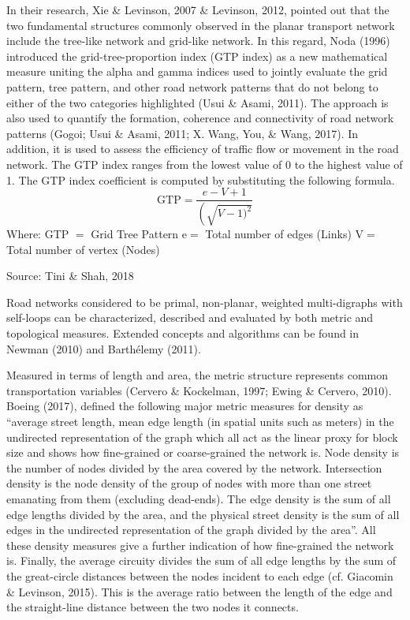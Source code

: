 In their research, Xie \& Levinson, 2007 \& Levinson, 2012, pointed out that the two fundamental structures commonly observed in the planar transport network include the tree-like network and grid-like network. In this regard, Noda (1996) introduced the grid-tree-proportion index (GTP index) as a new mathematical measure uniting the alpha and gamma indices used to jointly evaluate the grid pattern, tree pattern, and other road network patterns that do not belong to either of the two categories  highlighted (Usui \& Asami, 2011). The approach is also used to quantify the formation, coherence and connectivity of road network patterns (Gogoi; Usui \& Asami, 2011; X. Wang, You, & Wang, 2017). In addition, it is used to assess the efficiency of traffic flow or movement in the road network. The GTP index ranges from the lowest value of 0 to the highest value of 1. The GTP index coefficient is computed by substituting the following formula.
$$
\mathrm{GTP}=\frac{e-V+1}{\left(\sqrt{V-1)^{2}}\right.}
$$
Where:
GTP $=$ Grid Tree Pattern
$\mathrm{e}=$ Total number of edges (Links)
$\mathrm{V}=$ Total number of vertex (Nodes)
\caption{Source: Tini \& Shah, 2018}

Road networks considered to be primal, non-planar, weighted multi-digraphs with self-loops can be characterized, described and evaluated by both metric and topological measures. Extended concepts and algorithms can be found in Newman (2010) and Barthélemy (2011). 

Measured in terms of length and area, the metric structure represents common transportation variables (Cervero \& Kockelman, 1997; Ewing \& Cervero, 2010). Boeing (2017), defined the following major metric measures for density as “average street length, mean edge length (in spatial units such as meters) in the undirected representation of the graph which all act as the linear proxy for block size and shows how fine-grained or coarse-grained the network is. Node density is the number of nodes divided by the area covered by the network. Intersection density is the node density of the group of nodes with more than one street emanating from them (excluding dead-ends). The edge density is the sum of all edge lengths divided by the area, and the physical street density is the sum of all edges in the undirected representation of the graph divided by the area”. All these density measures give a further indication of how fine-grained the network is. Finally, the average circuity divides the sum of all edge lengths by the sum of the great-circle distances between the nodes incident to each edge (cf. Giacomin \& Levinson, 2015). This is the average ratio between the length of the edge and the straight-line distance between the two nodes it connects.

